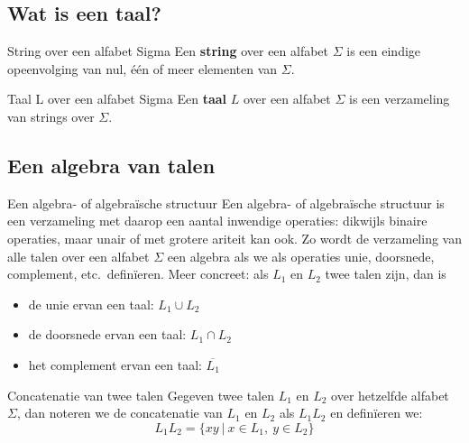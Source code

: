 \subsection{Wat is een taal?}

\vspace{0.5cm}

\begin{theo}{String over een alfabet Sigma}
    Een \textbf{string} over een alfabet $\Sigma$ is een eindige opeenvolging van nul, één of meer elementen van $\Sigma$.
\end{theo}

\begin{theo}{Taal L over een alfabet Sigma}
    Een \textbf{taal} $L$ over een alfabet $\Sigma$ is een verzameling van strings over $\Sigma$.
\end{theo}

\subsection{Een algebra van talen}

\vspace{0.5cm}

\begin{theo}{Een algebra- of algebraïsche structuur}
    Een algebra- of algebraïsche structuur is een verzameling met daarop een aantal inwendige operaties:
    dikwijls binaire operaties, maar unair of met grotere ariteit kan ook. Zo wordt de verzameling van
    alle talen over een alfabet $\Sigma$ een algebra als we als operaties unie, doorsnede, complement, etc.\ definïeren.
    Meer concreet: als $L_1$ en $L_2$ twee talen zijn, dan is
    \begin{itemize}
        \item de unie ervan een taal: $L_1 \cup L_2$
        \item de doorsnede ervan een taal: $L_1 \cap L_2$
        \item het complement ervan een taal: $\overline{L_1}$
    \end{itemize}
\end{theo}

\begin{pro}{Concatenatie van twee talen}
    Gegeven twee talen $L_1$ en $L_2$ over hetzelfde alfabet $\Sigma$, dan noteren we de concatenatie van
    $L_1$ en $L_2$ als $L_1L_2$ en definïeren we:
    \begin{equation*}
        L_{1}L_{2} = \{ xy  \ | \ x \in L_1,  \ y \in L_2\}
    \end{equation*}
    \vspace{-0.3cm}
\end{pro}

